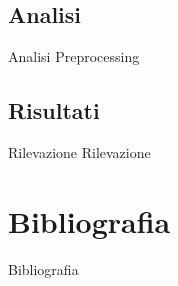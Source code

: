 \documentclass[xcolor={dvipsnames}]{beamer}%
\begin{document}
	\subsection{Analisi}
		\begin{frame}{Analisi}
			Preprocessing
		\end{frame}
	
	\subsection{Risultati}
		\begin{frame}{Rilevazione}
			Rilevazione
		\end{frame}
	
\section*{Bibliografia}	
	\begin{frame}{Bibliografia}
	{
		\footnotesize
		\nocite{anderson2003introduction,mardia1979multivariate,pandasManual,pandasSite,Labib2006}
		
		
	}
	\end{frame}
\end{document}
